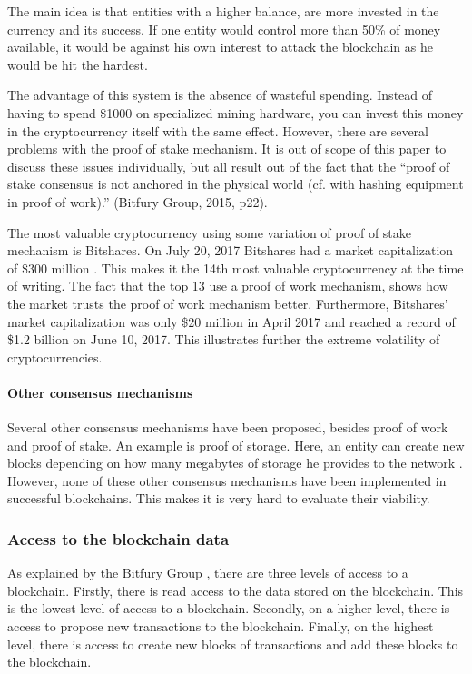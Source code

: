 The main idea is that entities with a higher balance, are more invested in the currency and its success. If one entity would control more than 50\% of money available, it would be against his own interest to attack the blockchain as he would be hit the hardest. 

The advantage of this system is the absence of wasteful spending. Instead of having to spend \$1000 on specialized mining hardware, you can invest this money in the cryptocurrency itself with the same effect. However, there are several problems with the proof of stake mechanism. It is out of scope of this paper to discuss these issues individually, but all result out of the fact that the ``proof of stake consensus is not anchored in the physical world (cf. with hashing equipment in proof of work).'' (Bitfury Group, 2015, p22). 

The most valuable cryptocurrency using some variation of proof of stake mechanism is Bitshares. On July 20, 2017 Bitshares had a market capitalization of \$300 million \cite{general-market-cap}. This makes it the 14th most valuable cryptocurrency at the time of writing. The fact that the top 13 use a proof of work mechanism, shows how the market trusts the proof of work mechanism better. Furthermore, Bitshares' market capitalization was only \$20 million in April 2017 and reached a record of \$1.2 billion on June 10, 2017. This illustrates further the extreme volatility of cryptocurrencies.

\paragraph{Other consensus mechanisms}

Several other consensus mechanisms have been proposed, besides proof of work and proof of stake. An example is proof of storage. Here, an entity can create new blocks depending on how many megabytes of storage he provides to the network \cite{proof-of-whatever}. However, none of these other consensus mechanisms have been implemented in successful blockchains. This makes it is very hard to evaluate their viability. 

\subsubsection{Access to the blockchain data}

As explained by the Bitfury Group \cite{bitfury-permissioned}, there are three levels of access to a blockchain. Firstly, there is read access to the data stored on the blockchain. This is the lowest level of access to a blockchain. Secondly, on a higher level, there is access to propose new transactions to the blockchain. Finally, on the highest level, there is access to create new blocks of transactions and add these blocks to the blockchain.


